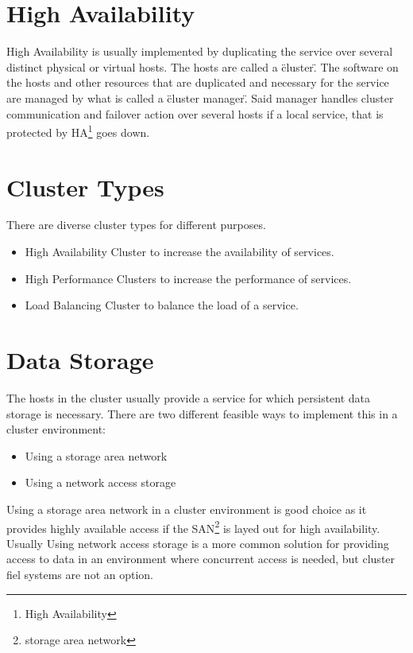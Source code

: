 \section{High Availability}


High Availability is usually implemented by duplicating the service over several distinct physical or
virtual hosts. The hosts are called a \"cluster\". The software on the hosts and other resources
that are duplicated and necessary for the service are managed by what is called a \"cluster manager\".
Said manager handles cluster communication and failover action over several hosts if a local service,
that is protected by HA\footnote{High Availability} goes down.

\section{Cluster Types}

There are diverse cluster types for different purposes.
\begin{itemize}
\item High Availability Cluster to increase the availability of services.
\item High Performance Clusters to increase the performance of services.
\item Load Balancing Cluster to balance the load of a service.
\end{itemize}

\section{Data Storage}

The hosts in the cluster usually provide a service for which persistent data storage is necessary.
There are two different feasible ways to implement this in a cluster environment:
\begin{itemize}
\item Using a storage area network
\item Using a network access storage
\end{itemize}

Using a storage area network in a cluster environment is good choice as it provides highly available access if the SAN\footnote{storage area network} is layed out for high availability. Usually 
Using network access storage is a more common solution for providing access to data in an environment where concurrent access is needed, but cluster fiel systems are not an option.

